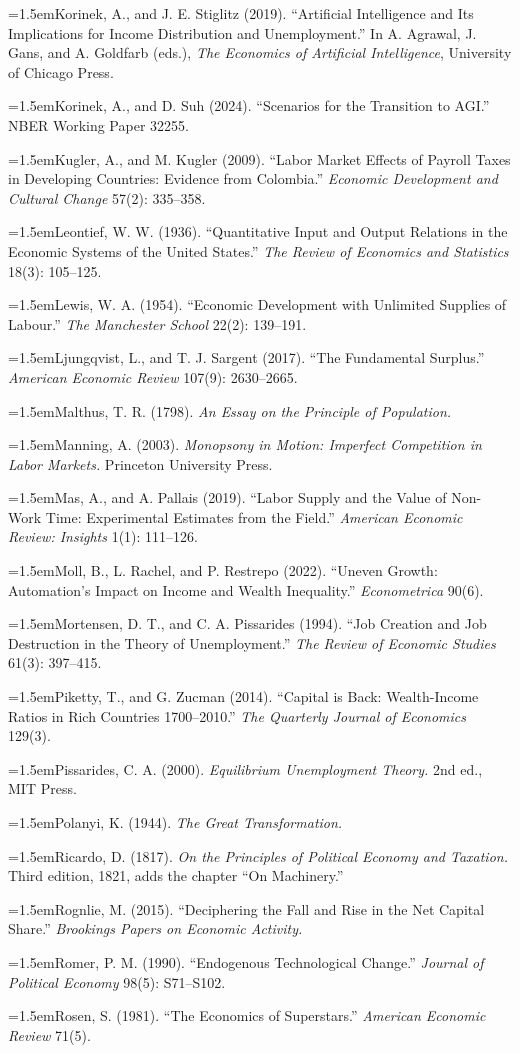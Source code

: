 \documentclass[12pt]{article}
\theoremstyle{plain}
\newcommand{\refentry}[1]{\par\hangindent=1.5em\hangafter=1\noindent #1}
\begin{document}
{\refentry{Korinek, A., and J. E. Stiglitz (2019). ``Artificial Intelligence and Its Implications for Income Distribution and Unemployment.'' In A. Agrawal, J. Gans, and A. Goldfarb (eds.), \emph{The Economics of Artificial Intelligence}, University of Chicago Press.}
\refentry{Korinek, A., and D. Suh (2024). ``Scenarios for the Transition to AGI.'' NBER Working Paper 32255.}
\refentry{Kugler, A., and M. Kugler (2009). ``Labor Market Effects of Payroll Taxes in Developing Countries: Evidence from Colombia.'' \emph{Economic Development and Cultural Change} 57(2): 335--358.}
\refentry{Leontief, W. W. (1936). ``Quantitative Input and Output Relations in the Economic Systems of the United States.'' \emph{The Review of Economics and Statistics} 18(3): 105--125.}
\refentry{Lewis, W. A. (1954). ``Economic Development with Unlimited Supplies of Labour.'' \emph{The Manchester School} 22(2): 139--191.}
\refentry{Ljungqvist, L., and T. J. Sargent (2017). ``The Fundamental Surplus.'' \emph{American Economic Review} 107(9): 2630--2665.}
\refentry{Malthus, T. R. (1798). \emph{An Essay on the Principle of Population.}}
\refentry{Manning, A. (2003). \emph{Monopsony in Motion: Imperfect Competition in Labor Markets.} Princeton University Press.}
\refentry{Mas, A., and A. Pallais (2019). ``Labor Supply and the Value of Non-Work Time: Experimental Estimates from the Field.'' \emph{American Economic Review: Insights} 1(1): 111--126.}
\refentry{Moll, B., L. Rachel, and P. Restrepo (2022). ``Uneven Growth: Automation's Impact on Income and Wealth Inequality.'' \emph{Econometrica} 90(6).}
\refentry{Mortensen, D. T., and C. A. Pissarides (1994). ``Job Creation and Job Destruction in the Theory of Unemployment.'' \emph{The Review of Economic Studies} 61(3): 397--415.}
\refentry{Piketty, T., and G. Zucman (2014). ``Capital is Back: Wealth-Income Ratios in Rich Countries 1700--2010.'' \emph{The Quarterly Journal of Economics} 129(3).}
\refentry{Pissarides, C. A. (2000). \emph{Equilibrium Unemployment Theory.} 2nd ed., MIT Press.}
\refentry{Polanyi, K. (1944). \emph{The Great Transformation.}}
\refentry{Ricardo, D. (1817). \emph{On the Principles of Political Economy and Taxation.} Third edition, 1821, adds the chapter ``On Machinery.''}
\refentry{Rognlie, M. (2015). ``Deciphering the Fall and Rise in the Net Capital Share.'' \emph{Brookings Papers on Economic Activity.}}
\refentry{Romer, P. M. (1990). ``Endogenous Technological Change.'' \emph{Journal of Political Economy} 98(5): S71--S102.}
\refentry{Rosen, S. (1981). ``The Economics of Superstars.'' \emph{American Economic Review} 71(5).}
}
\end{document}
